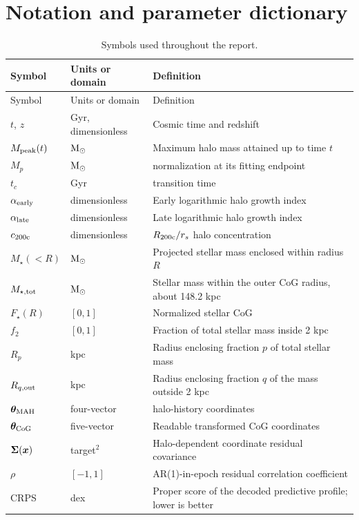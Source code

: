 \section{Notation and parameter dictionary}
\label{app:notation}

\begin{longtable}{@{}p{}p{}p{}@{}}
  \caption{Symbols used throughout the report.}\label{tab:notation}\\
  \toprule
  Symbol & Units or domain & Definition \\
  \midrule
  \endfirsthead
  \toprule
  Symbol & Units or domain & Definition \\
  \midrule
  \endhead
  $t$, $z$ & Gyr, dimensionless & Cosmic time and redshift \\
  $M_{\mathrm{peak}}(t)$ & $\mathrm{M}_{\odot}$ & Maximum halo mass attained up to time $t$ \\
  $M_p$ & $\mathrm{M}_{\odot}$ & \diffmah{} normalization at its fitting endpoint \\
  $t_c$ & Gyr & \diffmah{} transition time \\
  $\alpha_{\rm early}$ & dimensionless & Early logarithmic halo growth index \\
  $\alpha_{\rm late}$ & dimensionless & Late logarithmic halo growth index \\
  $c_{200\mathrm{c}}$ & dimensionless & $R_{200\mathrm{c}}/r_s$ halo concentration \\
  $M_\star(<R)$ & $\mathrm{M}_{\odot}$ & Projected stellar mass enclosed within radius $R$ \\
  $M_{\star,\rm tot}$ & $\mathrm{M}_{\odot}$ & Stellar mass within the outer CoG radius, about 148.2 kpc \\
  $F_\star(R)$ & $[0,1]$ & Normalized stellar CoG \\
  $f_2$ & $[0,1]$ & Fraction of total stellar mass inside 2 kpc \\
  $R_p$ & kpc & Radius enclosing fraction $p$ of total stellar mass \\
  $R_{q,\rm out}$ & kpc & Radius enclosing fraction $q$ of the mass outside 2 kpc \\
  $\bm{\theta}_{\rm MAH}$ & four-vector & \diffmah{} halo-history coordinates \\
  $\bm{\theta}_{\mathrm{CoG}}$ & five-vector & Readable transformed CoG coordinates \\
  $\bm{\Sigma}(\bm{x})$ & target$^2$ & Halo-dependent coordinate residual covariance \\
  $\rho$ & $[-1,1]$ & AR(1)-in-epoch residual correlation coefficient \\
  CRPS & dex & Proper score of the decoded predictive profile; lower is better \\
  \bottomrule
\end{longtable}

